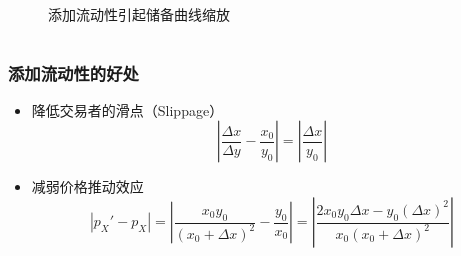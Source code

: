 \documentclass{beamer}
\begin{document}
\begin{frame}
\begin{columns}
\begin{column}{0.5\textwidth}
\begin{figure}[htbp]
                \caption{添加流动性引起储备曲线缩放}
            \end{figure}
        \end{column}
    \end{columns}
\end{frame}

\begin{frame}
    \frametitle{添加流动性的好处}

    \begin{itemize}
        \item 降低交易者的滑点（Slippage）
        \begin{equation}
            \left| \frac{\Delta x}{\Delta y} - \frac{x_0}{y_0} \right|
             = \left| \frac{\Delta x}{y_0} \right|
        \end{equation}
        \item 减弱价格推动效应
        \begin{equation}
            |p_X'-p_X| = \left| \frac{x_0y_0}{(x_0+\Delta x)^2} - \frac{y_0}{x_0} \right| = \left| \frac{2x_0y_0\Delta x - y_0(\Delta x)^2}{x_0(x_0+\Delta x)^2} \right|
        \end{equation}
    \end{itemize}
\end{frame}
\end{document}
